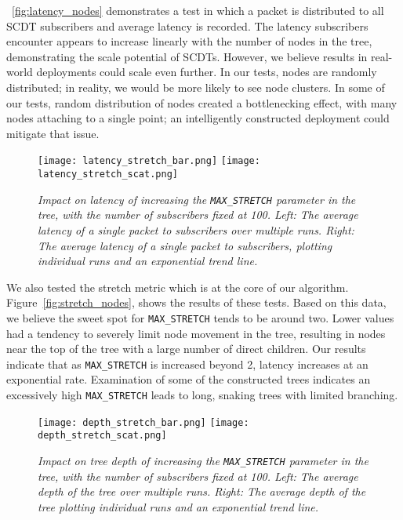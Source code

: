 ~\autoref{fig:latency_nodes} demonstrates a test in which a packet is distributed to all SCDT subscribers and average latency is recorded. The latency subscribers encounter appears to increase linearly with the number of nodes in the tree, demonstrating the scale potential of SCDTs. However, we believe results in real-world deployments could scale even further. In our tests, nodes are randomly distributed; in reality, we would be more likely to see node clusters. In some of our tests, random distribution of nodes created a bottlenecking effect, with many nodes attaching to a single point; an intelligently constructed deployment could mitigate that issue.

\begin{figure}[h]
	\begin{center}
		\texttt{[image: latency\_stretch\_bar.png]}
		\texttt{[image: latency\_stretch\_scat.png]}
	\end{center}
	\vspace{-1.3em}
	\caption{\small \itshape Impact on latency of increasing the \texttt{MAX\_STRETCH} parameter in the tree, with the number of subscribers fixed at 100. Left: The average latency of a single packet to subscribers over multiple runs. Right: The average latency of a single packet to subscribers, plotting individual runs and an exponential trend line.}
	\vspace{-1em}
	\label{fig:stretch_nodes}
\end{figure}

We also tested the stretch metric which is at the core of our algorithm. Figure~\autoref{fig:stretch_nodes}, shows the results of these tests. Based on this data, we believe the sweet spot for \texttt{MAX\_STRETCH} tends to be around two. Lower values had a tendency to severely limit node movement in the tree, resulting in nodes near the top of the tree with a large number of direct children. Our results indicate that as \texttt{MAX\_STRETCH} is increased beyond 2, latency increases at an exponential rate. Examination of some of the constructed trees indicates an excessively high \texttt{MAX\_STRETCH} leads to long, snaking trees with limited branching.

\begin{figure}[h]
	\begin{center}
		\texttt{[image: depth\_stretch\_bar.png]}
		\texttt{[image: depth\_stretch\_scat.png]}
	\end{center}
	\vspace{-1.3em}
	\caption{\small \itshape Impact on tree depth of increasing the \texttt{MAX\_STRETCH} parameter in the tree, with the number of subscribers fixed at 100. Left: The average depth of the tree over multiple runs. Right: The average depth of the tree plotting individual runs and an exponential trend line.}
	\vspace{-1em}
	\label{fig:depth_stretch}
\end{figure}

